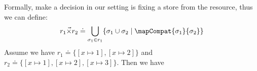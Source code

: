 
Formally, make a decision in our setting is fixing a store from the resource, thus we can define:
\begin{align*}
  r_1 \vec{\times} r_2 \doteq \bigcup_{\sigma_1 \in r_1} \{ \sigma_1 \cup \sigma_2 \mid \mapCompat{\sigma_1}{\sigma_2} \}
\end{align*}\noindent
Assume we have $r_1 \doteq \{[x\mapsto 1], [x\mapsto 2]\}$ and $r_2 \doteq \{[x\mapsto 1], [x\mapsto 2], [x\mapsto 3]\}$. Then we have

